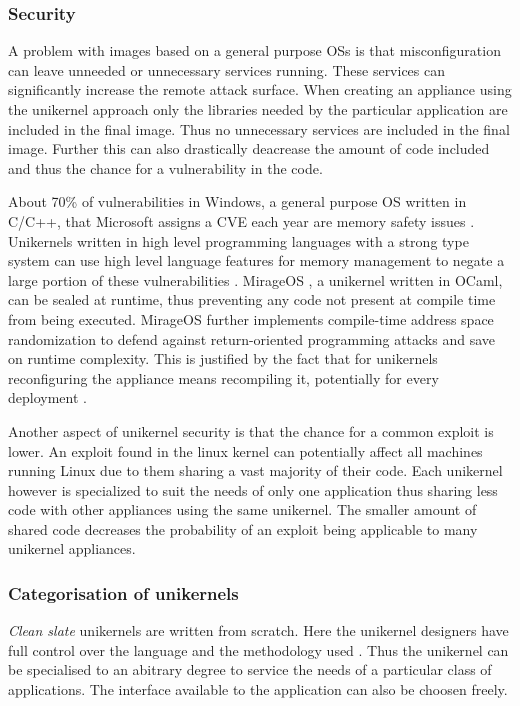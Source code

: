 \documentclass[10pt,twocolumn,a4paper]{article}
\begin{document}
    \subsubsection{Security}
      A problem with images based on a general purpose OSs is that misconfiguration can
      leave unneeded or unnecessary services running. 
      These services can significantly increase the remote attack surface.
      When creating an appliance using the unikernel approach only the libraries
      needed by the particular application are included in the final image.
      Thus no unnecessary services are included in the final image.
      Further this can also drastically deacrease the amount of code included and thus the chance
      for a vulnerability in the code.
      
      About 70\% of vulnerabilities in Windows, a general purpose OS written in C/C++,
      that Microsoft assigns a CVE each year are memory safety issues \cite{msrc-19-07}.
      Unikernels written in high level programming languages with a strong type system 
      can use high level language features for memory management to negate a large
      portion of these vulnerabilities \cite{madhavapeddy13, lankes19}.
      MirageOS \cite{madhavapeddy13}, a unikernel written in OCaml, can be sealed \cite{hunt07} at runtime,
      thus preventing any code not present at compile time from being executed.
      MirageOS further implements compile-time address space randomization to defend against
      return-oriented programming attacks and save on runtime complexity.
      This is justified by the fact that for unikernels reconfiguring the appliance 
      means recompiling it, potentially for every deployment \cite{madhavapeddy13}.

      Another aspect of unikernel security is that the chance for a common exploit is lower.
      An exploit found in the linux kernel can potentially affect all machines running Linux
      due to them sharing a vast majority of their code.
      Each unikernel however is specialized to suit the needs of only one application thus
      sharing less code with other appliances using the same unikernel.
      The smaller amount of shared code decreases the probability of an exploit being applicable
      to many unikernel appliances.

    \subsubsection{Categorisation of unikernels}\label{sec:categories-of-unikernels}
      \textit{Clean slate} unikernels are written from scratch.
      Here the unikernel designers have full control over the language
      and the methodology used \cite{raza19}.
      Thus the unikernel can be specialised to an abitrary degree to service the needs
      of a particular class of applications.
      The interface available to the application can also be choosen freely.
\end{document}

